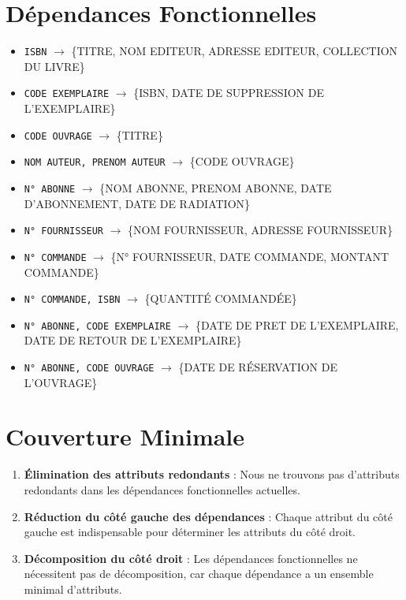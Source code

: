 \documentclass[a4paper,11pt]{article}
\begin{document}
\section{Dépendances Fonctionnelles}
\begin{itemize}
    \item \texttt{ISBN} $\rightarrow$ \{TITRE, NOM EDITEUR, ADRESSE EDITEUR, COLLECTION DU LIVRE\}
    \item \texttt{CODE EXEMPLAIRE} $\rightarrow$ \{ISBN, DATE DE SUPPRESSION DE L’EXEMPLAIRE\}
    \item \texttt{CODE OUVRAGE} $\rightarrow$ \{TITRE\}
    \item \texttt{NOM AUTEUR, PRENOM AUTEUR} $\rightarrow$ \{CODE OUVRAGE\}
    \item \texttt{N° ABONNE} $\rightarrow$ \{NOM ABONNE, PRENOM ABONNE, DATE D'ABONNEMENT, DATE DE RADIATION\}
    \item \texttt{N° FOURNISSEUR} $\rightarrow$ \{NOM FOURNISSEUR, ADRESSE FOURNISSEUR\}
    \item \texttt{N° COMMANDE} $\rightarrow$ \{N° FOURNISSEUR, DATE COMMANDE, MONTANT COMMANDE\}
    \item \texttt{N° COMMANDE, ISBN} $\rightarrow$ \{QUANTITÉ COMMANDÉE\}
    \item \texttt{N° ABONNE, CODE EXEMPLAIRE} $\rightarrow$ \{DATE DE PRET DE L’EXEMPLAIRE, DATE DE RETOUR DE L’EXEMPLAIRE\}
    \item \texttt{N° ABONNE, CODE OUVRAGE} $\rightarrow$ \{DATE DE RÉSERVATION DE L'OUVRAGE\}
\end{itemize}

\section{Couverture Minimale}
\begin{enumerate}
    \item \textbf{Élimination des attributs redondants} : Nous ne trouvons pas d'attributs redondants dans les dépendances fonctionnelles actuelles.
    \item \textbf{Réduction du côté gauche des dépendances} : Chaque attribut du côté gauche est indispensable pour déterminer les attributs du côté droit.
    \item \textbf{Décomposition du côté droit} : Les dépendances fonctionnelles ne nécessitent pas de décomposition, car chaque dépendance a un ensemble minimal d'attributs.
\end{enumerate}
\end{document}
